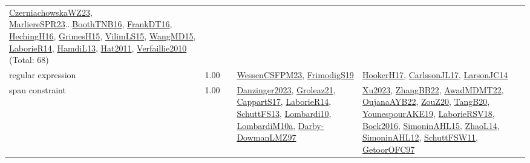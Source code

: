 {\begin{longtable}{p{3cm}r>{\raggedright\arraybackslash}p{6cm}>{\raggedright\arraybackslash}p{6cm}>{\raggedright\arraybackslash}p{8cm}}
\hyperref[detail:CzerniachowskaWZ23]{CzerniachowskaWZ23}, \hyperref[detail:MarliereSPR23]{MarliereSPR23}...\hyperref[detail:BoothTNB16]{BoothTNB16}, \hyperref[detail:FrankDT16]{FrankDT16}, \hyperref[detail:HechingH16]{HechingH16}, \hyperref[detail:GrimesH15]{GrimesH15}, \hyperref[detail:VilimLS15]{VilimLS15}, \hyperref[detail:WangMD15]{WangMD15}, \hyperref[detail:LaborieR14]{LaborieR14}, \hyperref[detail:HamdiL13]{HamdiL13}, \hyperref[detail:Hat2011]{Hat2011}, \hyperref[detail:Verfaillie2010]{Verfaillie2010} (Total: 68)\\
\index{regular expression}\index{Constraints!regular expression}regular expression &  1.00 &  & \hyperref[detail:WessenCSFPM23]{WessenCSFPM23}, \hyperref[detail:FrimodigS19]{FrimodigS19} & \hyperref[detail:HookerH17]{HookerH17}, \hyperref[detail:CarlssonJL17]{CarlssonJL17}, \hyperref[detail:LarsonJC14]{LarsonJC14}\\
\index{span constraint}\index{Constraints!span constraint}span constraint &  1.00 &  & \hyperref[detail:Danzinger2023]{Danzinger2023}, \hyperref[detail:Groleaz21]{Groleaz21}, \hyperref[detail:CappartS17]{CappartS17}, \hyperref[detail:LaborieR14]{LaborieR14}, \hyperref[detail:SchuttFS13]{SchuttFS13}, \hyperref[detail:Lombardi10]{Lombardi10}, \hyperref[detail:LombardiM10a]{LombardiM10a}, \hyperref[detail:Darby-DowmanLMZ97]{Darby-DowmanLMZ97} & \hyperref[detail:Xu2023]{Xu2023}, \hyperref[detail:ZhangBB22]{ZhangBB22}, \hyperref[detail:AwadMDMT22]{AwadMDMT22}, \hyperref[detail:OujanaAYB22]{OujanaAYB22}, \hyperref[detail:ZouZ20]{ZouZ20}, \hyperref[detail:TangB20]{TangB20}, \hyperref[detail:YounespourAKE19]{YounespourAKE19}, \hyperref[detail:LaborieRSV18]{LaborieRSV18}, \hyperref[detail:Boek2016]{Boek2016}, \hyperref[detail:SimoninAHL15]{SimoninAHL15}, \hyperref[detail:ZhaoL14]{ZhaoL14}, \hyperref[detail:SimoninAHL12]{SimoninAHL12}, \hyperref[detail:SchuttFSW11]{SchuttFSW11}, \hyperref[detail:GetoorOFC97]{GetoorOFC97}\\

\end{longtable}}
